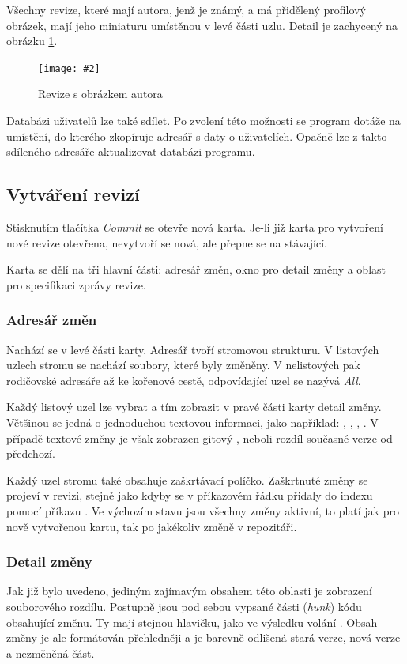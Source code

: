 \documentclass[
  biblatex,
  glossaries,
  index
]{kidiplom}
\newcommand{\pic}[4]{
\begin{figure}[h]
\centering
\texttt{[image: \#2]}
\caption{#3}
\label{fig:#4}
\end{figure}}
\begin{document}
Všechny revize, které mají autora, jenž je známý, a má přidělený profilový obrázek, mají jeho miniaturu umístěnou v levé části uzlu. Detail je zachycený na obrázku \ref{fig:user}.

\pic{10cm}{user.png}{Revize s obrázkem autora}{user}

Databázi uživatelů lze také sdílet. Po zvolení této možnosti se program dotáže na umístění, do kterého zkopíruje adresář s daty o uživatelích. Opačně lze z takto sdíleného adresáře aktualizovat databázi programu.

\subsection{Vytváření revizí}
Stisknutím tlačítka {\it Commit} se otevře nová karta. Je-li již karta pro vytvoření nové revize otevřena, nevytvoří se nová, ale přepne se na stávající.

Karta se dělí na tři hlavní části: adresář změn, okno pro detail změny a oblast pro specifikaci zprávy revize.

\subsubsection{Adresář změn}
Nachází se v levé části karty. Adresář tvoří stromovou strukturu. V listových uzlech stromu se nachází soubory, které byly změněny. V nelistových pak rodičovské adresáře až ke kořenové cestě, odpovídající uzel se nazývá {\it All}.

Každý listový uzel lze vybrat a tím zobrazit v pravé části karty detail změny. Většinou se jedná o jednoduchou textovou informaci, jako například: , , , . V případě textové změny je však zobrazen gitový , neboli rozdíl současné verze od předchozí.

Každý uzel stromu také obsahuje zaškrtávací políčko. Zaškrtnuté změny se projeví v revizi, stejně jako kdyby se v příkazovém řádku přidaly do indexu pomocí příkazu . Ve výchozím stavu jsou všechny změny aktivní, to platí jak pro nově vytvořenou kartu, tak po jakékoliv změně v repozitáři.

\subsubsection{Detail změny}
Jak již bylo uvedeno, jediným zajímavým obsahem této oblasti je zobrazení souborového rozdílu. Postupně jsou pod sebou vypsané části ({\it hunk}) kódu obsahující změnu. Ty mají stejnou hlavičku, jako ve výsledku volání . Obsah změny je ale formátován přehledněji a je barevně odlišená stará verze, nová verze a nezměněná část.
\end{document}
